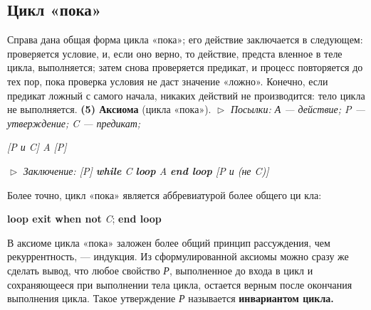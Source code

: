 \subsection{Цикл «пока»}
\noindent Справа  дана  общая  форма  цикла  «пока»;  его 
действие заключается в следующем: проверяется 
условие, и, если оно верно, то действие, предста­
вленное в теле цикла, выполняется; затем снова 
проверяется предикат, и процесс повторяется до
тех пор, пока проверка условия не даст значение «ложно». Конечно, если 
предикат ложный с самого начала, никаких действий не производится: 
тело цикла не выполняется.
\newline
\textbf{(5) Аксиома} (цикла «пока»).
\newline
$\vartriangleright$ \textit{Посылки: А --- действие; P --- утверждение; C --- предикат;}
\begin{center}
\textit{[P и C] A [P]}
\end{center}
$\vartriangleright$ \textit{Заключение:  \textit{[P]} \textbf{while} \textit{C} \textbf{loop} \textit{A} \textbf{end loop} \textit{[P и (не C)]}}

Более точно, цикл «пока» является аббревиатурой более общего ци­
кла:
\begin{center}
\textbf{loop exit when not} \textit{C};  \textbf{end loop} 
\end{center}
В аксиоме цикла «пока» заложен более общий принцип рассуждения, чем 
рекуррентность,  — индукция.  Из  сформулированной аксиомы можно 
сразу же сделать вывод, что любое свойство \textit{Р}, выполненное до входа 
в цикл и сохраняющееся при выполнении тела цикла, остается верным 
после окончания выполнения цикла. Такое утверждение \textit{Р} называется 
\textbf{инвариантом цикла.}

